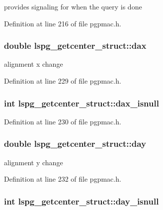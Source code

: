 provides signaling for when the query is done 



Definition at line 216 of file pgpmac.\-h.

\hypertarget{structlspg__getcenter__struct_a17db52848c28852a470222ec93ae8886}{
\subsubsection[{dax}]{\setlength{\rightskip}{0pt plus 5cm}double lspg\-\_\-getcenter\-\_\-struct\-::dax}}\label{structlspg__getcenter__struct_a17db52848c28852a470222ec93ae8886}


alignment x change 



Definition at line 229 of file pgpmac.\-h.

\hypertarget{structlspg__getcenter__struct_a621b489777d61e9db8b33b784b8d70f9}{
\subsubsection[{dax\-\_\-isnull}]{\setlength{\rightskip}{0pt plus 5cm}int lspg\-\_\-getcenter\-\_\-struct\-::dax\-\_\-isnull}}\label{structlspg__getcenter__struct_a621b489777d61e9db8b33b784b8d70f9}


Definition at line 230 of file pgpmac.\-h.

\hypertarget{structlspg__getcenter__struct_a9ce0f29540f2ff47be9788565d19f1b8}{
\subsubsection[{day}]{\setlength{\rightskip}{0pt plus 5cm}double lspg\-\_\-getcenter\-\_\-struct\-::day}}\label{structlspg__getcenter__struct_a9ce0f29540f2ff47be9788565d19f1b8}


alignment y change 



Definition at line 232 of file pgpmac.\-h.

\hypertarget{structlspg__getcenter__struct_a36f57a319288810caf365cca7827ff96}{
\subsubsection[{day\-\_\-isnull}]{\setlength{\rightskip}{0pt plus 5cm}int lspg\-\_\-getcenter\-\_\-struct\-::day\-\_\-isnull}}\label{structlspg__getcenter__struct_a36f57a319288810caf365cca7827ff96}


